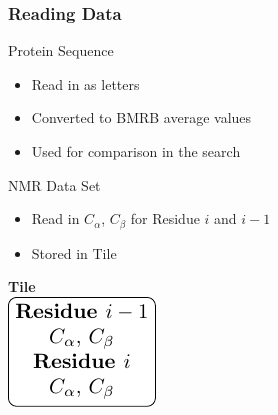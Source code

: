 \documentclass{beamer}
\begin{document}
\begin{frame}
	\frametitle{Reading Data}
	\begin{minipage}{0.45\textwidth}
		\begin{block}{Protein Sequence}
			\begin{itemize}
				\item Read in as letters
				\item Converted to BMRB average values
				\item Used for comparison in the search
			\end{itemize}
		\end{block}
		\begin{block}{NMR Data Set}
			\begin{itemize}
				\item Read in $C_{\alpha}$, $C_{\beta}$ for Residue $i$ and $i-1$
				\item Stored in Tile
			\end{itemize}
		\end{block}
	\end{minipage}
	\begin{minipage}{0.15\textwidth}

	
	\end{minipage}
	\begin{minipage}{0.45\textwidth}
	\begin{center}
		\huge\textbf{Tile}\\
		\vspace {12pt}
		\includegraphics[width=\textwidth]{tile_fig_no_conf}
	\end{center}
	\end{minipage}
\end{frame}
\end{document}
